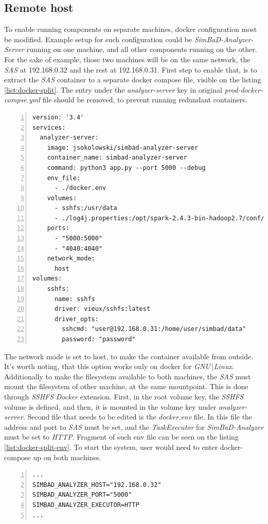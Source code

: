 \subsection{Remote host}
To enable running components on separate machines, docker configuration most be modified. Example setup for such configuration could be \textit{SimBaD-Analyzer-Server} running on one  machine, and all other components running on the other.
For the sake of example, those two machines will be on the same network, the \textit{SAS} at 192.168.0.32 and the rest at 192.168.0.31. First step to enable that, is to extract the \textit{SAS} container to a separate docker compose file, visible on the listing \ref{list:docker-split}. The entry under the \textit{analyzer-server} key in original \textit{prod-docker-compse.yml} file should be removed, to prevent running redundant containers.
\begin{lstlisting}[label=list:docker-split,caption= docker-compose file for standalone \textit{SimBaD-Analyzer-Server}, basicstyle=\footnotesize\ttfamily, numbers=left, escapechar=|, numbers=left]
version: '3.4'
services:
  analyzer-server:
    image: jsokolowski/simbad-analyzer-server
    container_name: simbad-analyzer-server
    command: python3 app.py --port 5000 --debug
    env_file:
      - ./docker.env
    volumes:
      - sshfs:/usr/data
      - ./log4j.properties:/opt/spark-2.4.3-bin-hadoop2.7/conf/log4j.properties
    ports:
      - "5000:5000"
      - "4040:4040"
    network_mode:
      host
volumes:
    sshfs:
      name: sshfs
      driver: vieux/sshfs:latest
      driver_opts:
        sshcmd: "user@192.168.0.31:/home/user/simbad/data"
        password: "password"
\end{lstlisting}
The network mode is set to host, to make the container available from outside. It's worth noting, that this option works only on docker for \textit{GNU\textbackslash Linux}. Additionally to make the filesystem available to both machines, the \textit{SAS} must mount the filesystem of other machine, at the same mountpoint. This is done through \textit{SSHFS} \textit{Docker} extension. First, in the root volume key, the \textit{SSHFS} volume is defined, and then, it is mounted in the volume key under \textit{analyzer-server}. Second file that needs to be edited is the \textit{docker.env} file. In this file the address and port to \textit{SAS} must be set, and the \textit{TaskExecutor} for \textit{SimBaD-Analyzer} must be set to \textit{HTTP}. Fragment of such env file can be seen on the listing \ref{list:docker-split-env}. To start the system, user would need to enter docker-compose up on both machines.
\begin{lstlisting}[label=list:docker-split-env,caption=prod-docker-compose.yaml file, basicstyle=\footnotesize\ttfamily, numbers=left, escapechar=|]
...
SIMBAD_ANALYZER_HOST="192.168.0.32"
SIMBAD_ANALYZER_PORT="5000"
SIMBAD_ANALYZER_EXECUTOR=HTTP
...
\end{lstlisting}
